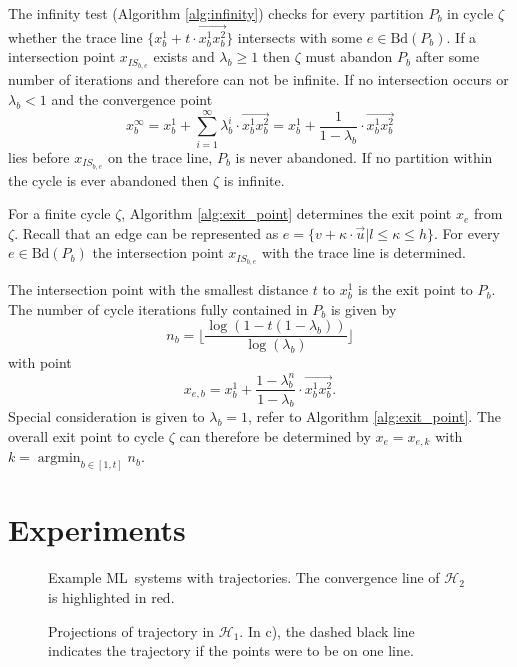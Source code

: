 \documentclass[copyright,creativecommons]{packages/eptcs}
\newcommand{\ml}{\mbox{ML}}
\newcommand{\bd}{{\mbox{Bd}}}
\newcommand{\cycle}{\zeta}
\begin{document}
The infinity test (Algorithm \ref{alg:infinity}) checks for every partition $P_b$ in cycle $\cycle$ whether the trace line $\{x_b^1 + t \cdot \overrightarrow{x_b^1x_b^2}\}$ intersects with some $e \in \bd(P_b)$. If a intersection point $x_{IS_{b,e}}$ exists and $\lambda_b \geq 1$ then $\cycle$ must abandon $P_b$ after some number of iterations and therefore can not be infinite. If no intersection occurs or $\lambda_b < 1$ and the convergence point \[x_b^\infty = x_b^1 + \sum_{i = 1}^\infty \lambda_b^i \cdot \overrightarrow{x_b^1x_b^2} = x_b^1 + \frac{1}{1-\lambda_b} \cdot \overrightarrow{x_b^1x_b^2}\] lies before $x_{IS_{b,e}}$ on the trace line, $P_b$ is never abandoned. If no partition within the cycle is ever abandoned then $\cycle$ is infinite.


For a finite cycle $\cycle$, Algorithm \ref{alg:exit_point} determines the exit point $x_e$ from $\cycle$. Recall that an edge can be represented as $e = \{v + \kappa \cdot \vec{u} | l \leq \kappa \leq h\}$. For every $e \in \bd(P_b)$ the intersection point $x_{IS_{b,e}}$ with the trace line is determined. 

The intersection point with the smallest distance $t$ to $x_b^1$ is the exit point to $P_b$. The number of cycle iterations fully contained in $P_b$ is given by \[n_b = \Big\lfloor \frac{\log(1 - t(1 - \lambda_b))}{\log(\lambda_b)} \Big\rfloor\] with point \[x_{e,b} = x_b^1 + \frac{1-\lambda_b^n}{1-\lambda_b} \cdot \overrightarrow{x_b^1x_b^2}.\] Special consideration is given to $\lambda_b = 1$, refer to Algorithm \ref{alg:exit_point}. The overall exit point to cycle $\cycle$ can therefore be determined by $x_e = x_{e,k}$ with $k = \operatorname{argmin}_{b \in [1,t]} n_b$.





\section{Experiments}\label{sec:experiments}

\begin{figure}[tb]
  \centering
  \caption{Example \ml~systems with trajectories. The convergence line of $\mathcal{H}_2$ is highlighted in red.}
  \label{fig:example_systems}
\end{figure}

\begin{figure}[tb]
  \centering
  \caption{Projections of trajectory in $\mathcal{H}_1$. In c), the dashed black line indicates the trajectory if the points were to be on one line.}
  \label{fig:projections1}
\end{figure}
\end{document}
